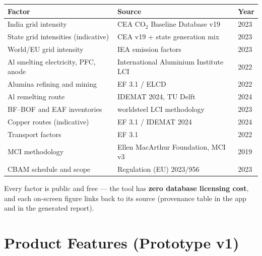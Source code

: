 \documentclass[11pt,a4paper]{article}
\begin{document}
\begin{center}
\begin{tabular}{@{}lll@{}}
\toprule
\textbf{Factor} & \textbf{Source} & \textbf{Year} \\
\midrule
India grid intensity & CEA CO$_2$ Baseline Database v19 & 2023 \\
State grid intensities (indicative) & CEA v19 + state generation mix & 2023 \\
World/EU grid intensity & IEA emission factors & 2023 \\
Al smelting electricity, PFC, anode & International Aluminium Institute LCI & 2022 \\
Alumina refining and mining & EF 3.1 / ELCD & 2022 \\
Al remelting route & IDEMAT 2024, TU Delft & 2024 \\
BF--BOF and EAF inventories & worldsteel LCI methodology & 2023 \\
Copper routes (indicative) & EF 3.1 / IDEMAT 2024 & 2024 \\
Transport factors & EF 3.1 & 2022 \\
MCI methodology & Ellen MacArthur Foundation, MCI v3 & 2019 \\
CBAM schedule and scope & Regulation (EU) 2023/956 & 2023 \\
\bottomrule
\end{tabular}
\end{center}

Every factor is public and free --- the tool has \textbf{zero database licensing cost}, and
each on-screen figure links back to its source (provenance table in the app and in the
generated report).

\section{Product Features (Prototype v1)}
\end{document}
